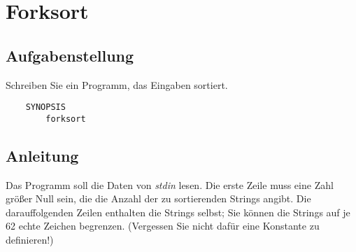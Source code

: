 




\section{Forksort}

\subsection{Aufgabenstellung}
Schreiben Sie ein Programm, das Eingaben sortiert.
\begin{verbatim}
    SYNOPSIS
        forksort
\end{verbatim}

\subsection{Anleitung}
Das Programm soll die Daten von \emph{stdin} lesen. Die erste Zeile muss eine
Zahl größer Null sein, die die Anzahl der zu sortierenden Strings angibt.
Die darauffolgenden Zeilen enthalten die Strings selbst; Sie können die
Strings auf je 62 echte Zeichen begrenzen. (Vergessen Sie nicht dafür eine
Konstante zu definieren!)

